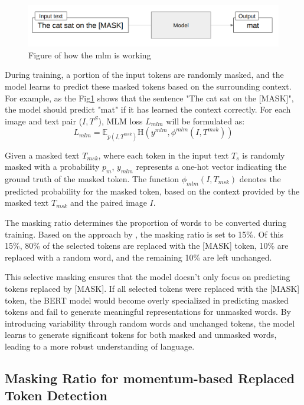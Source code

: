\begin{figure}
  \includegraphics[width=\linewidth]{img/mlm_flow.png}
  \caption{Figure of how the mlm is working}
  \label{fig:mlm_flow}
\end{figure}

During training, a portion of the input tokens are randomly masked, and the model learns to predict these masked tokens based on the surrounding context. For example, as the Fig\ref{fig:mlm_flow} shows that the sentence "The cat sat on the [MASK]", the model should predict "mat" if it has learned the context correctly. For each image and text pair ($I,T^S$), MLM loss $L_{mlm}$ will be formulated as:
\[
  L_{mlm} = \mathbb{E}_{p \left( I,T^{msk}\right) }\mathrm{H}\left(y^{mlm}, \phi^{mlm}\left(I,T^{msk}\right)\right)
\]

Given a masked text \( T_{msk} \), where each token in the input text \( T_s \) is randomly masked with a probability \( p_m \), \( y_{mlm} \) represents a one-hot vector indicating the ground truth of the masked token. The function \( \phi_{mlm}(I, T_{msk}) \) denotes the predicted probability for the masked token, based on the context provided by the masked text \( T_{msk} \) and the paired image \( I \).

The masking ratio determines the proportion of words to be converted during training. Based on the approach by \cite{devlin2018bert}, the masking ratio is set to 15\%. Of this 15\%, 80\% of the selected tokens are replaced with the [MASK] token, 10\% are replaced with a random word, and the remaining 10\% are left unchanged.

This selective masking ensures that the model doesn't only focus on predicting tokens replaced by [MASK]. If all selected tokens were replaced with the [MASK] token, the BERT model would become overly specialized in predicting masked tokens and fail to generate meaningful representations for unmasked words. By introducing variability through random words and unchanged tokens, the model learns to generate significant tokens for both masked and unmasked words, leading to a more robust understanding of language.


\subsection{Masking Ratio for momentum-based Replaced Token Detection}

